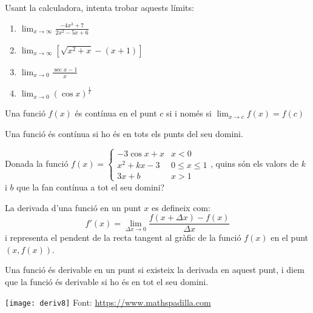 \documentclass{beamer}
\begin{document}
\begin{frame}[allowframebreaks]
  \begin{exercici}{}
    Usant la calculadora, intenta trobar aquests límits:
    \begin{multicols}{2}
    \begin{enumerate}
  \item $\lim_{x \rightarrow \infty} \frac{-4x^3+7}{2x^2-5x+6}$
  \item $\lim_{x \rightarrow \infty} \left[\sqrt{x^2+x}-(x+1)\right]$
  \columnbreak
  \item $\lim_{x \rightarrow 0} \frac{\sec{x}-1}{x}$
  \item $\lim_{x \rightarrow 0} (\cos{x})^{\frac{1}{x}}$
  \end{enumerate}
  \end{multicols}
  \end{exercici}
  \bigskip
  \begin{definicio}
    Una funció $f(x)$ és contínua en el punt $c$ si i només si $\lim_{x \rightarrow c} f(x) = f(c)$
  \end{definicio}

  Una funció és contínua si ho és en tots els punts del seu domini.

  \begin{exercici}{}
    Donada la funció $f(x)=\begin{cases}-3\cos{x}+x&x<0\\x^2+kx-3& 0\leq x\leq 1\\3x+b&  x >1\end{cases}$, quins són els valors de $k$ i $b$ que la fan contínua a tot el seu domini?
  \end{exercici}

  \begin{definicio}
    La derivada d'una funció en un punt $x$ es defineix com:
    \[
      f'(x) = \lim_{\Delta x \rightarrow 0} \frac{f(x+\Delta x)-f(x)}{\Delta x}
    \]
    i representa el pendent de la recta tangent al gràfic de la funció $f(x)$ en el punt $(x,f(x))$.
  \end{definicio}

  Una funció és derivable en un punt si existeix la derivada en aquest punt, i diem que la funció és derivable si ho és en tot el seu domini.
  \begin{center}
    \texttt{[image: deriv8]}
    \newline Font: \url{https://www.mathspadilla.com}
  \end{center}


\end{frame}
\end{document}
